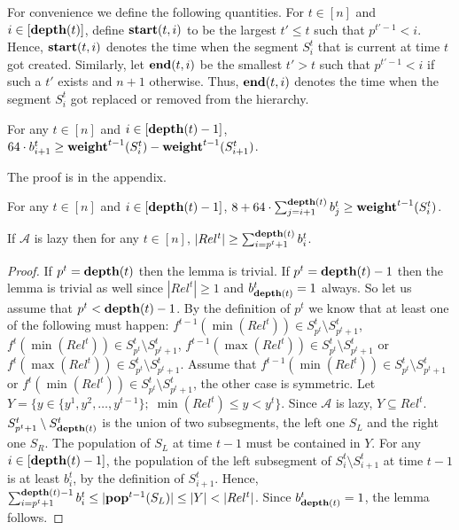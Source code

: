 \documentclass[runningheads,a4paper]{llncs}
\newcommand{\A}{\mathcal{A}}
\newcommand{\pop}{{\rm {\bf pop}}}
\newcommand{\weight}{{\rm {\bf weight}}}
\newcommand{\depth}{{\rm {\bf depth}}}
\newcommand{\starts}{{\rm {\bf start}}}
\newcommand{\sends}{{\rm {\bf end}}}
\begin{document}
For convenience we define the following quantities.
For $t\in[n]$ and $i\in[\depth(t)]$, define $\starts(t,i)$ to be the largest $t' \le t$ 
such that $p^{t'-1} < i$. Hence, $\starts(t,i)$ denotes the time when the segment $S^t_i$ that is current at time $t$ got created.
Similarly, let $\sends(t,i)$ be the smallest $t'>t$ such that $p^{t'-1} < i$ if such a $t'$ exists and $n+1$ otherwise.
Thus, $\sends(t,i)$ denotes the time when the segment $S^t_i$ got replaced or removed from the hierarchy. 

%


\begin{lemma}\label{l-p1}
For any $t\in[n]$ and $i\in[\depth(t)-1]$, $64\cdot b^t_{i+1} \ge \weight^{t-1}(S^t_i) - \weight^{t-1}(S^t_{i+1})$.
\end{lemma}

The proof is in the appendix.

\begin{corollary}\label{c-weight}
For any $t\in[n]$ and $i\in[\depth(t)-1]$, $8 + 64 \cdot \sum_{j=i+1}^{\depth(t)} b^t_{j} \ge \weight^{t-1}(S^t_i)$.
\end{corollary}


\begin{lemma}
If $\A$ is lazy then for any $t\in[n]$, $|Rel^t| \ge \sum_{i=p^t+1}^{\depth(t)} b^t_i$.
\end{lemma}

\begin{proof}
If $p^t = \depth(t)$ then the lemma is trivial. If $p^t = \depth(t)-1$ then the lemma is trivial as well
since $|Rel^t|\ge 1$ and $b^t_{\depth(t)}=1$ always. So let us assume that $p^t < \depth(t)-1$.
By the definition of $p^t$ we know that at least one of the following must happen: $f^{t-1}(\min(Rel^t)) \in S^t_{p^t} \setminus S^t_{p^t+1}$, $f^{t}(\min(Rel^t)) \in S^t_{p^t} \setminus S^t_{p^t+1}$, $f^{t-1}(\max(Rel^t)) \in S^t_{p^t} \setminus S^t_{p^t+1}$ or $f^{t}(\max(Rel^t)) \in S^t_{p^t} \setminus S^t_{p^t+1}$. Assume that $f^{t-1}(\min(Rel^t)) \in S^t_{p^t} \setminus S^t_{p^t+1}$ or $f^{t}(\min(Rel^t)) \in S^t_{p^t} \setminus S^t_{p^t+1}$,
the other case is symmetric. Let $Y = \{ y \in \{y^1,y^2,\dots,y^{t-1}\};\; \min(Rel^t) \le y < y^t\}$. 
Since $\A$ is lazy,  $Y \subseteq Rel^t$. $S^t_{p^t+1} \setminus S^t_{\depth(t)}$ is the union of two subsegments, the left one $S_L$ and the right one $S_R$.
The population of $S_L$ at time $t-1$ must be contained in $Y$.
For any $i\in [\depth(t)-1]$, the population of the left subsegment of $S^t_i \setminus S^t_{i+1}$ at time $t-1$ is at least $b^t_i$, by the definition of $S^t_{i+1}$. 
Hence, $\sum_{i=p^t+1}^{\depth(t)-1} b^t_i \le |\pop^{t-1}(S_L)| \le |Y| < |Rel^t|$. Since $b^t_{\depth(t)}=1$, the lemma follows.
\end{proof}
\end{document}
